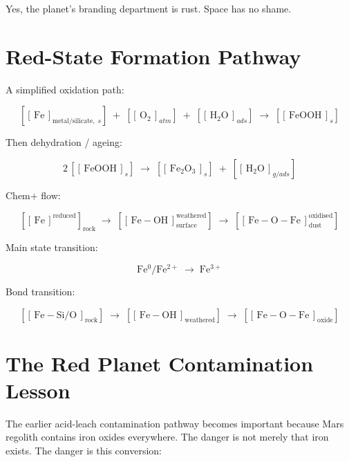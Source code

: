 \documentclass[11pt,a4paper]{article}
\newcommand{\cid}[3]{\!\left[\!\left[\,#1\,\right]^{\!#2}_{\!#3}\!\right]}
\newcommand{\cidb}[2]{\!\left[\!\left[\,#1\,\right]_{\!#2}\!\right]}
\newcommand{\cidp}[2]{\!\left[\!\left[\,#1\,\right]^{\!#2}\!\right]}
\begin{document}
\begin{smlaw}
Yes, the planet's branding department is rust.  Space has no shame.
\end{smlaw}

\section{Red-State Formation Pathway}

A simplified oxidation path:

\[
\cidb{\mathrm{Fe}}{\text{metal/silicate},\;s}
\;+\;\cidb{\mathrm{O_2}}{atm}
\;+\;\cidb{\mathrm{H_2O}}{ads}
\;\rightarrow\;
\cidb{\mathrm{FeOOH}}{s}
\]

Then dehydration / ageing:

\[
2\,\cidb{\mathrm{FeOOH}}{s}
\;\rightarrow\;
\cidb{\mathrm{Fe_2O_3}}{s}
\;+\;\cidb{\mathrm{H_2O}}{g/ads}
\]

Chem+ flow:

\[
\cidp{\mathrm{Fe}}{\text{reduced}}_{\!\text{rock}}
\;\rightarrow\;
\cid{\mathrm{Fe{-}OH}}{\text{weathered}}{\text{surface}}
\;\rightarrow\;
\cid{\mathrm{Fe{-}O{-}Fe}}{\text{oxidised}}{\text{dust}}
\]

Main state transition:

\begin{keybox}
\[
\mathrm{Fe^0/Fe^{2+}}
\;\rightarrow\;
\mathrm{Fe^{3+}}
\]
\end{keybox}

Bond transition:

\begin{keybox}
\[
\cidb{\mathrm{Fe{-}Si/O}}{\text{rock}}
\;\rightarrow\;
\cidb{\mathrm{Fe{-}OH}}{\text{weathered}}
\;\rightarrow\;
\cidb{\mathrm{Fe{-}O{-}Fe}}{\text{oxide}}
\]
\end{keybox}

\section{The Red Planet Contamination Lesson}

The earlier acid-leach contamination pathway becomes important because Mars
regolith contains iron oxides everywhere.  The danger is not merely that iron
exists.  The danger is this conversion:
\end{document}
